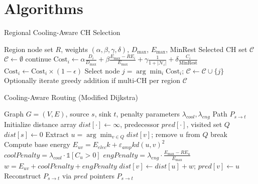 \section{Algorithms}
\begin{algorithm}[ht]
\caption{Regional Cooling-Aware CH Selection}\label{alg:ch-selection}
\begin{algorithmic}[1]
\Require Region node set $R$, weights $(\alpha,\beta,\gamma,\delta)$, $D_{\max}$, $E_{\max}$, MinRest
\Ensure Selected CH set $\mathcal{C}$
\State $\mathcal{C} \gets \emptyset$
   \State continue \EndIf
  \State $\mathrm{Cost}_i \gets \alpha \frac{D_i}{D_{\max}} + \beta \frac{E_{\max}-RE_i}{E_{\max}} + \gamma \frac{1}{1+|\mathcal{N}_i|} + \delta \frac{C_i}{\text{MinRest}}$
   $\mathrm{Cost}_i \gets \mathrm{Cost}_i \times (1-\epsilon)$ 
  \EndIf
\EndFor
\State Select node $j=\arg\min_i \mathrm{Cost}_i$; $\mathcal{C} \gets \mathcal{C} \cup \{j\}$
\State Optionally iterate greedy addition if multi-CH per region
\State \Return $\mathcal{C}$
\end{algorithmic}
\end{algorithm}

\begin{algorithm}[ht]
\caption{Cooling-Aware Routing (Modified Dijkstra)}\label{alg:routing}
\begin{algorithmic}[1]
\Require Graph $G=(V,E)$, source $s$, sink $t$, penalty parameters $\lambda_{cool}, \lambda_{eng}$
\Ensure Path $P_{s\to t}$
\State Initialize distance array $dist[\cdot]\gets \infty$, predecessor $pred[\cdot]$, visited set $Q$
\State $dist[s]\gets 0$
  \State Extract $u = \arg\min_{v \in Q} dist[v]$; remove $u$ from $Q$
   \State break \EndIf
    \State Compute base energy $E_{uv} = E_{elec}k + \varepsilon_{amp}k d(u,v)^2$
    \State $coolPenalty = \lambda_{cool} \cdot \mathbb{1}[C_u>0]$
    \State $engPenalty = \lambda_{eng} \cdot \frac{E_{\max}-RE_u}{E_{\max}}$
    \State $w = E_{uv} + coolPenalty + engPenalty$
      \State $dist[v] \gets dist[u] + w$; $pred[v] \gets u$
    \EndIf
  \EndFor
\EndWhile
\State Reconstruct $P_{s\to t}$ via $pred$ pointers
\State \Return $P_{s\to t}$
\end{algorithmic}
\end{algorithm}

